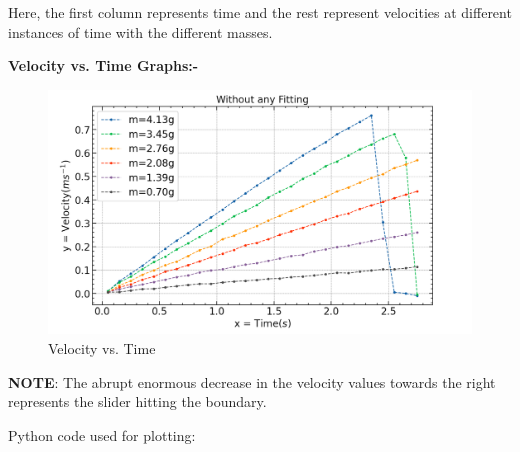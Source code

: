 \documentclass{article}
\begin{document}
 	Here, the first column represents time and the rest represent velocities at different instances of time with the different masses.
 	
 	\pagebreak
 	
 	
 	\textbf{Velocity vs. Time Graphs:-}
 	
 	\begin{figure}[H]
 		\centering
 		\includegraphics[scale=0.6]{Screenshot 2022-03-07 185137}
 		\caption{Velocity vs. Time}
 		\label{figure:veltimenf}%
 	\end{figure}
 
 	\textbf{NOTE}: The abrupt enormous decrease in the velocity values towards the right represents the 
 	slider hitting the boundary.
 
 	Python code used for plotting:
 	
\end{document}
